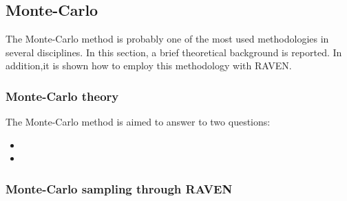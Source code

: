 \subsection{Monte-Carlo}
\label{sub:MC}
The Monte-Carlo method is probably one of the most used methodologies in several disciplines. In this section, a brief theoretical 
background is reported. In addition,it is shown how to employ this methodology with RAVEN.
\subsubsection{Monte-Carlo theory}
\label{subsub:MCtheory}
The Monte-Carlo method is aimed to answer to two questions:
\begin{itemize}
  \item 
  \item 
\end{itemize}
\subsubsection{Monte-Carlo sampling through RAVEN}
\label{subsub:MCexample}


